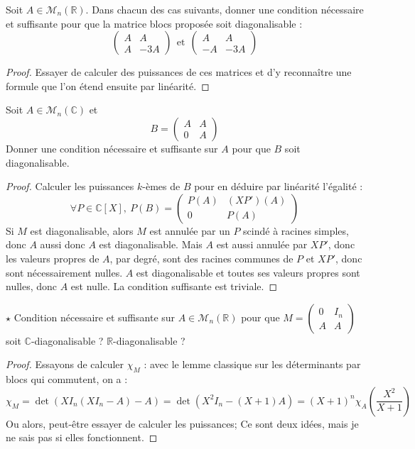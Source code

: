 \documentclass[french,a4paper]{article}
\newcommand{\R}{\mathbb{R}}
\newcommand{\C}{\mathbb{C}}
\theoremstyle{plain}
\theoremstyle{definition}
\theoremstyle{remark}
\begin{document}
\begin{ex}{}
	Soit $A\in\mathcal{M}_n(\R)$. Dans chacun des cas suivants, donner une condition nécessaire et suffisante pour que la matrice blocs proposée soit diagonalisable : $$\begin{pmatrix}
		A&A\\
		A&-3A
	\end{pmatrix}\ \ \text{et}\ \ \begin{pmatrix}
	A&A\\
	-A&-3A
	\end{pmatrix}$$
\end{ex}
\begin{proof}
	Essayer de calculer des puissances de ces matrices et d'y reconnaître une formule que l'on étend ensuite par linéarité.
\end{proof}

\begin{ex}{}
	Soit $A\in\mathcal{M}_n(\C)$ et $$B=\begin{pmatrix}
		A&A\\
		0&A
	\end{pmatrix}$$ Donner une condition nécessaire et suffisante sur $A$ pour que $B$ soit diagonalisable.
\end{ex}
\begin{proof}
	Calculer les puissances $k$-èmes de $B$ pour en déduire par linéarité l'égalité : $$\forall P\in\C[X],\ P(B)=\begin{pmatrix}
		P(A)&(XP')(A)\\
		0&P(A)
	\end{pmatrix}$$ Si $M$ est diagonalisable, alors $M$ est annulée par un $P$ scindé à racines simples, donc $A$ aussi donc $A$ est diagonalisable. Mais $A$ est aussi annulée par $XP'$, donc les valeurs propres de $A$, par degré, sont des racines communes de $P$ et $XP'$, donc sont nécessairement nulles. $A$ est diagonalisable et toutes ses valeurs propres sont nulles, donc $A$ est nulle. La condition suffisante est triviale.
\end{proof}

\begin{ex}{$\star$}
	Condition nécessaire et suffisante sur $A\in\mathcal{M}_n(\R)$ pour que $\displaystyle M=\begin{pmatrix}
		0&I_n\\
		A&A
	\end{pmatrix}$ soit $\C$-diagonalisable ? $\R$-diagonalisable ?
\end{ex}
\begin{proof}
	Essayons de calculer $\chi_M$ : avec le lemme classique sur les déterminants par blocs qui commutent, on a : $$\chi_M=\det(XI_n(XI_n-A)-A)=\det(X^2I_n-(X+1)A)=(X+1)^n\chi_A\left(\frac{X^2}{X+1}\right)$$ Ou alors, peut-être essayer de calculer les puissances; Ce sont deux idées, mais je ne sais pas si elles fonctionnent.
\end{proof}
\end{document}
